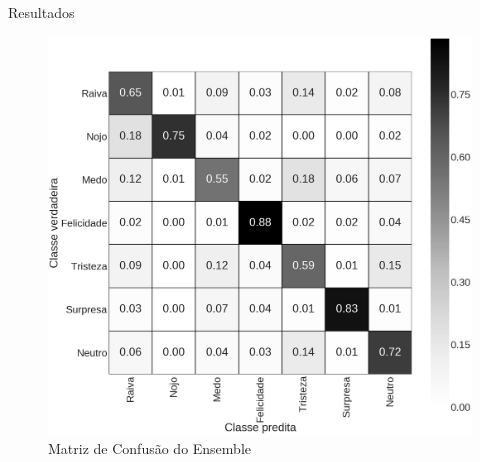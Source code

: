 \begin{frame}{Resultados}

 \begin{figure}
    \centering
    \includegraphics[width=0.7\linewidth]{img/cm_emsemble.png}
    \caption{Matriz de Confusão do Ensemble}
\end{figure}

\end{frame}